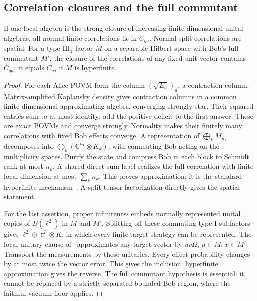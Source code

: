 \subsection{Correlation closures and the full commutant}
\begin{proposition}\label{prop:normal-closures}
If one local algebra is the strong closure of increasing finite-dimensional unital algebras, all normal finite correlations lie in $C_{qa}$. Normal split correlations are spatial. For a type $\mathrm{III}_1$ factor $M$ on a separable Hilbert space with Bob's full commutant $M'$, the closure of the correlations of any fixed unit vector contains $C_{qa}$; it equals $C_{qa}$ if $M$ is hyperfinite.
\end{proposition}
\begin{proof}
For each Alice POVM form the column $(\sqrt{E_a})_a$, a contraction column. Matrix-amplified Kaplansky density gives contraction columns in a common finite-dimensional approximating algebra, converging strongly-star. Their squared entries sum to at most identity; add the positive deficit to the first answer. These are exact POVMs and converge strongly. Normality makes their finitely many correlations with fixed Bob effects converge. A representation of $\bigoplus_k M_{n_k}$ decomposes into $\bigoplus_k(\mathbb C^{n_k}\otimes K_k)$, with commuting Bob acting on the multiplicity spaces. Purify the state and compress Bob in each block to Schmidt rank at most $n_k$. A shared direct-sum label realizes the full correlation with finite local dimension at most $\sum_k n_k$. This proves approximation; it is the standard hyperfinite mechanism~\cite[Section 4]{ScholzWerner}. A split tensor factorization directly gives the spatial statement.

For the last assertion, proper infiniteness embeds normally represented unital copies of $B(\ell^2)$ in $M$ and $M'$. Splitting off these commuting type-I subfactors gives $\ell^2\otimes\ell^2\otimes K$, in which every finite target strategy can be represented. The local-unitary clause of~\cite[Theorem 51, equation (97), arXiv version 2]{vLSWWpure} approximates any target vector by $uv\Omega$, $u\in M$, $v\in M'$. Transport the measurements by these unitaries. Every effect probability changes by at most twice the vector error. This gives the inclusion; hyperfinite approximation gives the reverse. The full commutant hypothesis is essential: it cannot be replaced by a strictly separated bounded Bob region, where the faithful-vacuum floor applies.
\end{proof}

